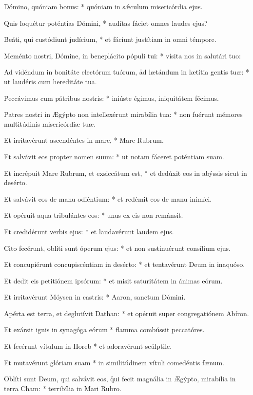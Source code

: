 \begin{psalmus}

 Dómino, quóniam bonus: * quóniam in sǽculum misericórdia ejus.

Quis loquétur poténtias Dómini, * audítas fáciet omnes laudes ejus?

Beáti, qui custódiunt judícium, * et fáciunt justítiam in omni témpore.

Meménto nostri, Dómine, in beneplácito pópuli tui: * vísita nos in salutári tuo:

Ad vidéndum in bonitáte electórum tuórum, \f ad lætándum in lætítia gentis tuæ: * ut laudéris cum hereditáte tua.

Peccávimus cum pátribus nostris: * iniúste égimus, iniquitátem fécimus.

Patres nostri in Ægýpto non intellexérunt mirabília tua: * non fuérunt mémores multitúdinis misericórdiæ tuæ.

Et irritavérunt ascendéntes in mare, * Mare Rubrum.

Et salvávit eos propter nomen suum: * ut notam fáceret poténtiam suam.

Et incrépuit Mare Rubrum, et exsiccátum est, * et dedúxit eos in abýssis sicut in desérto.

Et salvávit eos de manu odiéntium: * et redémit eos de manu inimíci.

Et opéruit aqua tribulántes eos: * unus ex eis non remánsit.

Et credidérunt verbis ejus: * et laudavérunt laudem ejus.

Cito fecérunt, oblíti sunt óperum ejus: * et non sustinuérunt consílium ejus.

Et concupiérunt concupiscéntiam in desérto: * et tentavérunt Deum in inaquóso.

Et dedit eis petitiónem ipsórum: * et misit saturitátem in ánimas eórum.

Et irritavérunt Móysen in castris: * Aaron, sanctum Dómini.

Apérta est terra, et deglutívit Dathan: * et opéruit super congregatiónem Abíron.

Et exársit ignis in synagóga eórum * flamma combússit peccatóres.

Et fecérunt vítulum in Horeb * et adoravérunt scúlptile.

Et mutavérunt glóriam suam * in similitúdinem vítuli comedéntis fænum.

Oblíti sunt Deum, qui salvávit eos, \f qui fecit magnália in Ægýpto, mirabília in terra Cham: * terribília in Mari Rubro.


\end{psalmus}
